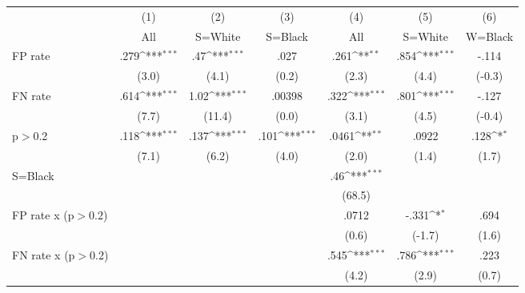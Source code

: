 \begin{table}[htbp]\centering
\def\sym#1{\ifmmode^{#1}\else\(^{#1}\)\fi}
\begin{tabular}{l*{6}{c}}
\hline\hline
                &\multicolumn{1}{c}{(1)}&\multicolumn{1}{c}{(2)}&\multicolumn{1}{c}{(3)}&\multicolumn{1}{c}{(4)}&\multicolumn{1}{c}{(5)}&\multicolumn{1}{c}{(6)}\\
                &\multicolumn{1}{c}{All}&\multicolumn{1}{c}{S=White}&\multicolumn{1}{c}{S=Black}&\multicolumn{1}{c}{All}&\multicolumn{1}{c}{S=White}&\multicolumn{1}{c}{W=Black}\\
\hline
FP rate         &     .279\sym{***}&      .47\sym{***}&     .027         &     .261\sym{**} &     .854\sym{***}&    -.114         \\
                &    (3.0)         &    (4.1)         &    (0.2)         &    (2.3)         &    (4.4)         &   (-0.3)         \\
FN rate         &     .614\sym{***}&     1.02\sym{***}&   .00398         &     .322\sym{***}&     .801\sym{***}&    -.127         \\
                &    (7.7)         &   (11.4)         &    (0.0)         &    (3.1)         &    (4.5)         &   (-0.4)         \\
p$>$0.2         &     .118\sym{***}&     .137\sym{***}&     .101\sym{***}&    .0461\sym{**} &    .0922         &     .128\sym{*}  \\
                &    (7.1)         &    (6.2)         &    (4.0)         &    (2.0)         &    (1.4)         &    (1.7)         \\
S=Black         &                  &                  &                  &      .46\sym{***}&                  &                  \\
                &                  &                  &                  &   (68.5)         &                  &                  \\
FP rate x (p$>$0.2)&                  &                  &                  &    .0712         &    -.331\sym{*}  &     .694         \\
                &                  &                  &                  &    (0.6)         &   (-1.7)         &    (1.6)         \\
FN rate x (p$>$0.2)&                  &                  &                  &     .545\sym{***}&     .786\sym{***}&     .223         \\
                &                  &                  &                  &    (4.2)         &    (2.9)         &    (0.7)         \\

\end{tabular}
\end{table}
